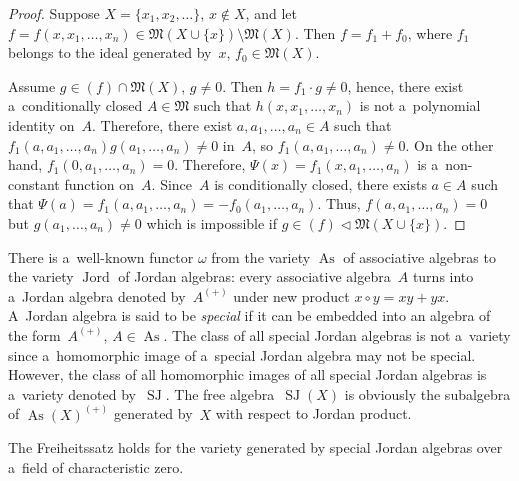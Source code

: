 \begin{proof}
Suppose $X=\{x_1,x_2,\dots \}$, $x\notin X$, and let $f=f(x, x_1,\dots, x_n)\in \mathfrak M(X\cup\{x\})\setminus{\mathfrak M}(X)$.
Then $f=f_1 + f_0$, where $f_1$ belongs to the ideal generated by~$x$, $f_0\in {\mathfrak M}(X)$.

Assume $g\in (f)\cap {\mathfrak M}(X)$, $g\ne 0$.
Then $h=f_1 \cdot g \ne 0$, hence, there exist a~conditionally closed $A\in \mathfrak M$ such that $h(x,x_1,\dots, x_n)$
is not a~polynomial identity on~$A$.
Therefore, there exist $a,a_1,\dots, a_n\in A$ such that $f_1(a, a_1,\dots, a_n) g(a_1,\dots, a_n)\ne 0 $ in~$A$, so
\mbox{$f_1(a, a_1,\dots, a_n)\ne 0$}.
On the other hand, $f_1(0,a_1,\dots, a_n)=0$.
Therefore, $\Psi(x) = f_1(x, a_1,\dots, a_n)$ is a~non-constant function on~$A$.
Since~$A$ is conditionally closed, there exists $a\in A$ such that $\Psi(a) = f_1(a, a_1,\dots, a_n) = -f_0(a_1,\dots,
a_n)$.
Thus, $f(a,a_1,\dots, a_n)=0$ but $g(a_1,\dots, a_n)\ne 0$ which is impossible if $g\in (f)\triangleleft \mathfrak
M(X\cup\{x\})$.
\end{proof}

There is a~well-known functor $\omega $ from the variety $\operatorname{As}$ of associative algebras to the variety $\operatorname{Jord}$ of Jordan
algebras: every associative algebra~$A$ turns into a~Jordan algebra denoted by~$A^{(+)}$ under new product $x\circ y=xy + yx$.
A~Jordan algebra is said to be {\em special} if it can be embedded into an algebra of the form~$A^{(+)}$, $A\in \operatorname{As}$.
The class of all special Jordan algebras is not a~variety since a~homomorphic image of a~special Jordan algebra may not be special.
However, the class of all homomorphic images of all special Jordan algebras is a~variety denoted by~$\operatorname{SJ}$.
The free algebra~$\operatorname{SJ}(X)$ is obviously the subalgebra of $\operatorname{As}(X)^{(+)}$ generated by~$X$ with respect to Jordan product.

\begin{corollary}
The Freiheitssatz holds for the variety generated by special Jordan algebras over a~field of characteristic zero.
\end{corollary}

